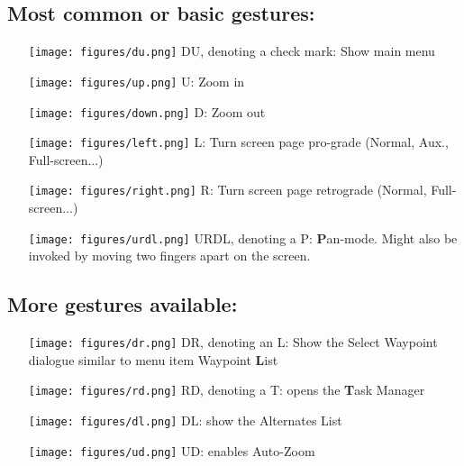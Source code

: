 \subsection*{Most common or basic gestures:}
\begin{itemize}
\item[\raisebox{-1em}
{\texttt{[image: figures/du.png]}}] DU, denoting a check mark: Show main menu 
\item[\raisebox{-1em}
{\texttt{[image: figures/up.png]}}] U: Zoom in 
\item[\raisebox{-1em}
{\texttt{[image: figures/down.png]}}] D: Zoom out 
\item[\raisebox{-1em}
{\texttt{[image: figures/left.png]}}] L: Turn screen page pro-grade (Normal, Aux., Full-screen...) 
\item[\raisebox{-1em}
{\texttt{[image: figures/right.png]}}] R: Turn screen page retrograde (Normal, Full-screen...) 
\item[\raisebox{-1em}
{\texttt{[image: figures/urdl.png]}}] URDL, denoting a P: \textbf{P}an-mode. Might also be invoked by 
moving two fingers apart on the screen.
\end{itemize}
\vspace{2em}

\subsection*{More gestures available:}
\begin{itemize}
\item[\raisebox{-1em}
{\texttt{[image: figures/dr.png]}}] DR, denoting an L: Show the Select Waypoint dialogue similar to menu 
item Waypoint \textbf{L}ist
\item[\raisebox{-1em}
{\texttt{[image: figures/rd.png]}}] RD, denoting a T: opens the \textbf{T}ask Manager
\item[\raisebox{-1em}
{\texttt{[image: figures/dl.png]}}] DL: show the Alternates List
\item[\raisebox{-1em}
{\texttt{[image: figures/ud.png]}}] UD: enables Auto-Zoom
\end{itemize}
\vspace{2em}

